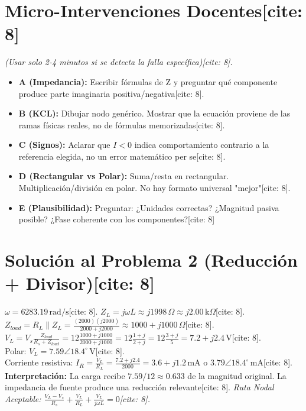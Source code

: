\documentclass[11pt, a4paper]{article}
\begin{document}
\section*{Micro-Intervenciones Docentes[cite: 8]}
\textit{(Usar solo 2-4 minutos si se detecta la falla específica)[cite: 8].}
\begin{itemize}
    \item \textbf{A (Impedancia):} Escribir fórmulas de Z y preguntar qué componente produce parte imaginaria positiva/negativa[cite: 8].
    \item \textbf{B (KCL):} Dibujar nodo genérico. Mostrar que la ecuación proviene de las ramas físicas reales, no de fórmulas memorizadas[cite: 8].
    \item \textbf{C (Signos):} Aclarar que $I < 0$ indica comportamiento contrario a la referencia elegida, no un error matemático per se[cite: 8].
    \item \textbf{D (Rectangular vs Polar):} Suma/resta en rectangular. Multiplicación/división en polar. No hay formato universal "mejor"[cite: 8].
    \item \textbf{E (Plausibilidad):} Preguntar: ¿Unidades correctas? ¿Magnitud pasiva posible? ¿Fase coherente con los componentes?[cite: 8]
\end{itemize}

\section*{Solución al Problema 2 (Reducción + Divisor)[cite: 8]}
$\omega = 6283.19\,\text{rad/s}$[cite: 8]. $Z_L = j\omega L \approx j1998\,\Omega \approx j2.00\,\text{k}\Omega$[cite: 8]. \\
$Z_{load} = R_L \parallel Z_L = \frac{(2000)(j2000)}{2000 + j2000} \approx 1000 + j1000\,\Omega$[cite: 8]. \\
$V_L = V_s \frac{Z_{load}}{R_s + Z_{load}} = 12 \frac{1000 + j1000}{2000 + j1000} = 12 \frac{1+j}{2+j} = 12 \frac{3+j}{5} = 7.2 + j2.4\,\text{V}$[cite: 8]. \\
Polar: $\boxed{V_L = 7.59\angle18.4^\circ\,\text{V}}$[cite: 8]. \\
Corriente resistiva: $I_R = \frac{V_L}{R_L} = \frac{7.2 + j2.4}{2000} = \boxed{3.6 + j1.2\,\text{mA}}$ o $\boxed{3.79\angle18.4^\circ\,\text{mA}}$[cite: 8]. \\
\textbf{Interpretación:} La carga recibe $7.59/12 \approx 0.633$ de la magnitud original. La impedancia de fuente produce una reducción relevante[cite: 8].
\textit{Ruta Nodal Aceptable: $\frac{V_L - V_s}{R_s} + \frac{V_L}{R_L} + \frac{V_L}{j\omega L} = 0$[cite: 8].}
\end{document}
